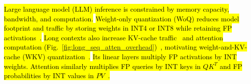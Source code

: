 \documentclass[sigconf,anonymous,nonacm]{acmart}
\newcommand{\wkv}{WKV}
\DeclareRobustCommand{\rev}[1]{\hl{#1}}
\begin{document}

\rev{Large language model (LLM) inference is constrained by memory capacity, bandwidth, and computation.} \rev{Weight-only quantization (WoQ) reduces model footprint and traffic by storing weights in INT4 or INT8 while retaining FP activations~\cite{frantar2022gptq,lin2023awq,dettmers2023spqr,shao2023omniquant,liu2024spinquant}.} \rev{Long contexts also increase KV-cache traffic~\cite{pagedattention} and attention computation (Fig.~\ref{fig:long_seq_atten_overhead})~\cite{attentionisallyouneed,flashattention,flashattention2}, motivating weight-and-KV-cache (\wkv{}) quantization~\cite{yue2024wkvquant,liu2024spinquant}.} \rev{Its linear layers multiply FP activations by INT weights. Attention similarly multiplies FP queries by INT keys in $QK^T$ and FP probabilities by INT values in $PV$~\cite{figna,yue2024wkvquant,liu2024spinquant}.}
\end{document}
